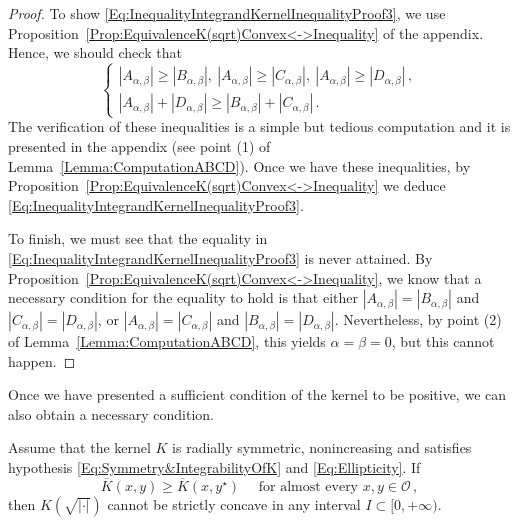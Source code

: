 \begin{proof}
	To show \eqref{Eq:InequalityIntegrandKernelInequalityProof3}, we use Proposition~\ref{Prop:EquivalenceK(sqrt)Convex<->Inequality} of the appendix. Hence, we should check that
	$$
	\begin{cases}
	|A_{\alpha,\beta}| \geq |B_{\alpha,\beta}|,\ |A_{\alpha,\beta}| \geq |C_{\alpha,\beta}|, \ |A_{\alpha,\beta}| \geq |D_{\alpha,\beta}|\,, \\
	|A_{\alpha,\beta}| + |D_{\alpha,\beta}| \geq |B_{\alpha,\beta}| + |C_{\alpha,\beta}|\,.
	\end{cases}
	$$
	The verification of these inequalities is a simple but tedious computation and it is presented in the appendix (see point (1) of Lemma~\ref{Lemma:ComputationABCD}). Once we have these inequalities, by Proposition~\ref{Prop:EquivalenceK(sqrt)Convex<->Inequality} we deduce \eqref{Eq:InequalityIntegrandKernelInequalityProof3}. 
    
    To finish, we must see that the equality in \eqref{Eq:InequalityIntegrandKernelInequalityProof3} is never attained. By Proposition~\ref{Prop:EquivalenceK(sqrt)Convex<->Inequality}, we know that a necessary condition for the equality to hold is that either $|A_{\alpha,\beta}| = |B_{\alpha,\beta}|$ and $|C_{\alpha,\beta}| = |D_{\alpha,\beta}|$, or $|A_{\alpha,\beta}| = |C_{\alpha,\beta}|$ and $|B_{\alpha,\beta}| = |D_{\alpha,\beta}|$. Nevertheless, by point (2) of Lemma~\eqref{Lemma:ComputationABCD}, this yields $\alpha = \beta = 0$, but this cannot happen.
\end{proof}

Once we have presented a sufficient condition of the kernel to be positive, we can also obtain a necessary condition.


\begin{proposition}
\label{Prop:ContraryKernelInequalityReflexion}
Assume that the kernel $K$ is radially symmetric, nonincreasing and satisfies hypothesis \eqref{Eq:Symmetry&IntegrabilityOfK} and \eqref{Eq:Ellipticity}. If
\begin{equation}
	\label{Eq:KernelInequalityReflexion2}
	\overline{K}(x,y) \geq \overline{K}(x, y^\star) \quad \text{ for almost every }x,y \in \mathcal{O}\,,
\end{equation}
then $K(\sqrt{|\cdot|})$ cannot be strictly concave in any interval $I\subset [0,+\infty)$. 
\end{proposition}

